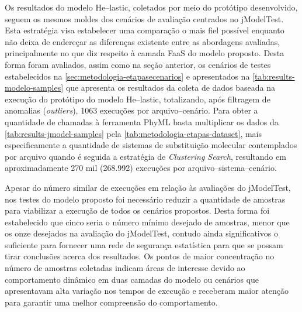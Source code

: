 \documentclass[english,brazilian]{UNISINOSmonografia} %
\begin{document}
Os resultados do modelo \textsf{He}--lastic, coletados por meio do protótipo desenvolvido, seguem os mesmos moldes dos cenários de avaliação centrados no jModelTest.
%
Esta estratégia visa estabelecer uma comparação o mais fiel possível enquanto não deixa de endereçar as diferenças existente entre as abordagens avaliadas, principalmente no que diz respeito à camada FaaS do modelo proposto.
%
Desta forma foram avaliados, assim como na seção anterior, os cenários de testes estabelecidos na \autoref{sec:metodologia-etapasecenarios}
e apresentados na \autoref{tab:results-modelo-samples} que apresenta os resultados da coleta de dados baseada na execução do protótipo do modelo \textsf{He}--lastic, totalizando, após filtragem de anomalias (\textit{outliers}), 1063 execuções por arquivo--cenário.
%
Para obter a quantidade de chamadas à ferramenta PhyML basta multiplicar os dados da \autoref{tab:results-jmodel-samples} pela \autoref{tab:metodologia-etapas-dataset}, mais especificamente a quantidade de sistemas de substituição molecular contemplados por arquivo quando é seguida a estratégia de \textit{Clustering Search}, resultando em aproximadamente 270 mil (268.992) execuções por arquivo--sistema--cenário.


Apesar do número similar de execuções em relação às avaliações do jModelTest, nos testes do modelo proposto foi necessário reduzir a quantidade de amostras para viabilizar a execução de todos os cenários propostos.
%
Desta forma foi estabelecido que cinco seria o número mínimo desejado de amostras, menor que os onze desejados na avaliação do jModelTest, contudo ainda significativos o suficiente para fornecer uma rede de segurança estatística para que se possam tirar conclusões acerca dos resultados.
%
Os pontos de maior concentração no número de amostras coletadas indicam áreas de interesse devido ao comportamento dinâmico em duas camadas do modelo ou cenários que apresentavam alta variação nos tempos de execução e receberam maior atenção para garantir uma melhor compreensão do comportamento.
\end{document}
